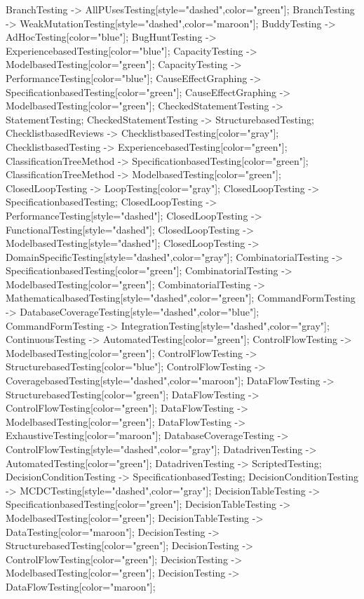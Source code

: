 \documentclass{article}
\begin{document}
{BranchTesting -> AllPUsesTesting[style="dashed",color="green"];
BranchTesting -> WeakMutationTesting[style="dashed",color="maroon"];
BuddyTesting -> AdHocTesting[color="blue"];
BugHuntTesting -> ExperiencebasedTesting[color="blue"];
CapacityTesting -> ModelbasedTesting[color="green"];
CapacityTesting -> PerformanceTesting[color="blue"];
CauseEffectGraphing -> SpecificationbasedTesting[color="green"];
CauseEffectGraphing -> ModelbasedTesting[color="green"];
CheckedStatementTesting -> StatementTesting;
CheckedStatementTesting -> StructurebasedTesting;
ChecklistbasedReviews -> ChecklistbasedTesting[color="gray"];
ChecklistbasedTesting -> ExperiencebasedTesting[color="green"];
ClassificationTreeMethod -> SpecificationbasedTesting[color="green"];
ClassificationTreeMethod -> ModelbasedTesting[color="green"];
ClosedLoopTesting -> LoopTesting[color="gray"];
ClosedLoopTesting -> SpecificationbasedTesting;
ClosedLoopTesting -> PerformanceTesting[style="dashed"];
ClosedLoopTesting -> FunctionalTesting[style="dashed"];
ClosedLoopTesting -> ModelbasedTesting[style="dashed"];
ClosedLoopTesting -> DomainSpecificTesting[style="dashed",color="gray"];
CombinatorialTesting -> SpecificationbasedTesting[color="green"];
CombinatorialTesting -> ModelbasedTesting[color="green"];
CombinatorialTesting -> MathematicalbasedTesting[style="dashed",color="green"];
CommandFormTesting -> DatabaseCoverageTesting[style="dashed",color="blue"];
CommandFormTesting -> IntegrationTesting[style="dashed",color="gray"];
ContinuousTesting -> AutomatedTesting[color="green"];
ControlFlowTesting -> ModelbasedTesting[color="green"];
ControlFlowTesting -> StructurebasedTesting[color="blue"];
ControlFlowTesting -> CoveragebasedTesting[style="dashed",color="maroon"];
DataFlowTesting -> StructurebasedTesting[color="green"];
DataFlowTesting -> ControlFlowTesting[color="green"];
DataFlowTesting -> ModelbasedTesting[color="green"];
DataFlowTesting -> ExhaustiveTesting[color="maroon"];
DatabaseCoverageTesting -> ControlFlowTesting[style="dashed",color="gray"];
DatadrivenTesting -> AutomatedTesting[color="green"];
DatadrivenTesting -> ScriptedTesting;
DecisionConditionTesting -> SpecificationbasedTesting;
DecisionConditionTesting -> MCDCTesting[style="dashed",color="gray"];
DecisionTableTesting -> SpecificationbasedTesting[color="green"];
DecisionTableTesting -> ModelbasedTesting[color="green"];
DecisionTableTesting -> DataTesting[color="maroon"];
DecisionTesting -> StructurebasedTesting[color="green"];
DecisionTesting -> ControlFlowTesting[color="green"];
DecisionTesting -> ModelbasedTesting[color="green"];
DecisionTesting -> DataFlowTesting[color="maroon"];
}
\end{document}
